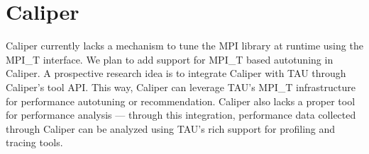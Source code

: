 \section{Caliper}
Caliper currently lacks a mechanism to tune the MPI library at runtime using the MPI\_T interface. We plan to add support for MPI\_T based autotuning in Caliper. A prospective research idea is to integrate Caliper with TAU through Caliper's tool API. This way, Caliper can leverage TAU's MPI\_T infrastructure for performance autotuning or recommendation. Caliper also lacks a proper tool for performance analysis --- through this integration, performance data collected through Caliper can be analyzed using TAU's rich support for profiling and tracing tools.
